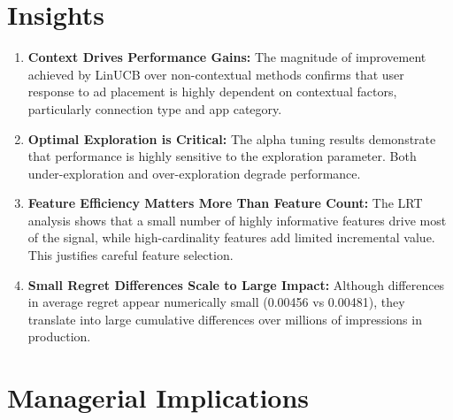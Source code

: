 \documentclass[12pt]{article}
\begin{document}
\section{Insights}

\begin{enumerate}[label=\alph*.]

\item \textbf{Context Drives Performance Gains:} The magnitude of improvement achieved by LinUCB over non-contextual methods confirms that user response to ad placement is highly dependent on contextual factors, particularly connection type and app category.

\item \textbf{Optimal Exploration is Critical:} The alpha tuning results demonstrate that performance is highly sensitive to the exploration parameter. Both under-exploration and over-exploration degrade performance.

\item \textbf{Feature Efficiency Matters More Than Feature Count:} The LRT analysis shows that a small number of highly informative features drive most of the signal, while high-cardinality features add limited incremental value. This justifies careful feature selection.

\item \textbf{Small Regret Differences Scale to Large Impact:} Although differences in average regret appear numerically small (0.00456 vs 0.00481), they translate into large cumulative differences over millions of impressions in production.

\end{enumerate}

\section{Managerial Implications}
\end{document}
